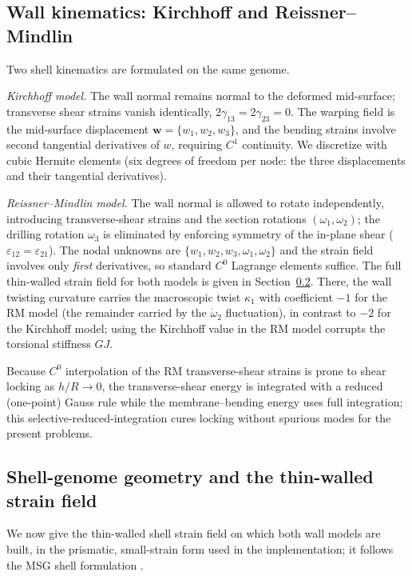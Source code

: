 \documentclass[preprint,12pt]{elsarticle}
\newcommand{\eps}{\varepsilon}
\newcommand{\hR}{h/R}
\begin{document}
\subsection{Wall kinematics: Kirchhoff and Reissner--Mindlin}
Two shell kinematics are formulated on the same genome.

\emph{Kirchhoff model.} The wall normal remains normal to the deformed
mid-surface; transverse shear strains vanish identically,
$2\gamma_{13}=2\gamma_{23}=0$. The warping field is the mid-surface
displacement $\bm{w}=\{w_1,w_2,w_3\}$, and the bending strains involve second
tangential derivatives of $w$, requiring $C^{1}$ continuity. We discretize with
cubic Hermite elements (six degrees of freedom per node: the three
displacements and their tangential derivatives).

\emph{Reissner--Mindlin model.} The wall normal is allowed to rotate
independently, introducing transverse-shear strains and the section rotations
$(\omega_1,\omega_2)$; the drilling rotation $\omega_3$ is eliminated by
enforcing symmetry of the in-plane shear ($\eps_{12}=\eps_{21}$). The nodal
unknowns are $\{w_1,w_2,w_3,\omega_1,\omega_2\}$ and the strain field involves
only \emph{first} derivatives, so standard $C^{0}$ Lagrange elements suffice.
The full thin-walled strain field for both models is given in
Section~\ref{sec:strainfield}. There, the wall twisting curvature carries the
macroscopic twist $\kappa_1$ with coefficient $-1$ for the RM model (the
remainder carried by the $\dot\omega_2$ fluctuation), in contrast to $-2$ for
the Kirchhoff model; using the Kirchhoff value in the RM model corrupts the
torsional stiffness $GJ$.

Because $C^{0}$ interpolation of the RM transverse-shear strains is prone to
shear locking as $\hR\to0$, the transverse-shear energy is integrated with a
reduced (one-point) Gauss rule while the membrane--bending energy uses full
integration; this selective-reduced-integration cures locking without spurious
modes for the present problems.

\subsection{Shell-genome geometry and the thin-walled strain field}
\label{sec:strainfield}
We now give the thin-walled shell strain field on which both wall models are
built, in the prismatic, small-strain form used in the implementation; it
follows the MSG shell formulation \cite{yu2016msg,liu2017msg}.
\end{document}
